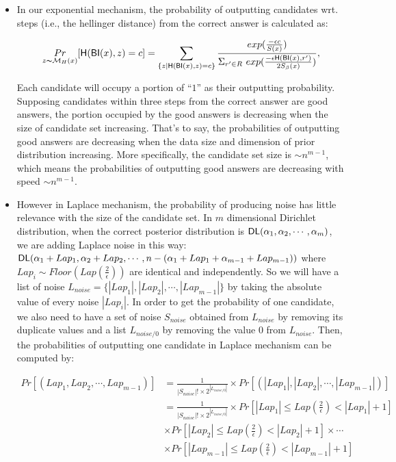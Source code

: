 \begin{itemize}

	\item In our exponential mechanism, the probability of outputting candidates wrt. steps (i.e., the hellinger distance) from the correct answer is calculated as:

	\begin{equation*}
	\underset{z \thicksim \mathcal{M}_H(x)}{Pr}[ \mathsf{H}(\mathsf{BI}(x), z) = c] = \sum\limits_{\{z| \mathsf{H}(\mathsf{BI}(x), z) = c\}}\frac{exp(\frac{- \epsilon c}{S(x)})}
	{\Sigma_{r' \in R}\ exp(\frac{-\epsilon \mathsf{H}(\mathsf{BI}(x),r')}{2 S_\beta(x)})},
	\end{equation*}

	Each candidate will occupy a portion of ``$1$'' as their outputting probability. Supposing candidates within three steps from the correct answer are good answers, the portion occupied by the good answers is decreasing when the size of candidate set increasing. That's to say, the probabilities of outputting good answers are decreasing when the data size and dimension of prior distribution increasing. More specifically, the candidate set size is $\sim n^{m-1}$, which means the probabilities of outputting good answers are decreasing with speed $\sim n^{m-1}$.

	\item However in Laplace mechanism, the probability of producing noise has little relevance with the size of the candidate set. In $m$ dimensional Dirichlet distribution, when the correct posterior distribution is $\mathsf{DL}(\alpha_1, \alpha_2, \cdots, \alpha_m)$, we are adding Laplace noise in this way: $\mathsf{DL}(\alpha_1 + Lap_1, \alpha_2 + Lap_2, \cdots, n - (\alpha_1 + Lap_1 + \alpha_{m-1} + Lap_{m-1}))$ where $Lap_i \sim Floor(Lap(\frac{2}{\epsilon}))$ are identical and independently. So we will have a list of noise $L_{noise} = \{|Lap_1|, |Lap_2|,\cdots ,|Lap_{m-1}|\}$ by taking the absolute value of every noise $|Lap_i|$. In order to get the probability of one candidate, we also need to have a set of noise $S_{noise}$ obtained from $L_{noise}$ by removing its duplicate values and a list $L_{noise/0}$ by removing the value 0 from $L_{noise}$. Then, the probabilities of outputting one candidate in Laplace mechanism can be computed by: 

	\begin{equation*}
	\begin{split}
	Pr[(Lap_1, Lap_2, \cdots, Lap_{m-1})]  
	& = \frac{1}{|S_{noise}|! \times 2^{|L_{noise/0}|}} \times Pr[(|Lap_1|, |Lap_2|, \cdots, |Lap_{m-1}|)] \\
	& = \frac{1}{|S_{noise}|! \times 2^{|L_{noise/0}|}} \times Pr[|Lap_1| \leq Lap(\frac{2}{\epsilon}) < |Lap_1| + 1] \\
	& \times Pr[|Lap_2| \leq Lap(\frac{2}{\epsilon}) < |Lap_2| + 1] \times \cdots \\
	& \times Pr[|Lap_{m-1}| \leq Lap(\frac{2}{\epsilon}) < |Lap_{m-1}| + 1]
	\end{split}
	\end{equation*}


\end{itemize}
